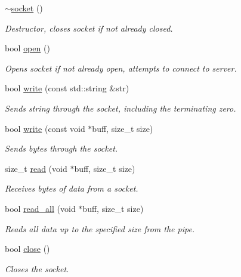 \begin{DoxyCompactItemize}
\hyperlink{classcpen333_1_1process_1_1posix_1_1socket_ad5dc9ffd6311247114538ec84f2c08a0}{$\sim$socket} ()
\begin{DoxyCompactList}\small\item\em Destructor, closes socket if not already closed. \end{DoxyCompactList}\item 
bool \hyperlink{classcpen333_1_1process_1_1posix_1_1socket_a0ac2e0452989cca9e6279602a8d73854}{open} ()
\begin{DoxyCompactList}\small\item\em Opens socket if not already open, attempts to connect to server. \end{DoxyCompactList}\item 
bool \hyperlink{classcpen333_1_1process_1_1posix_1_1socket_a80d3d77a066ebc082196bb2182021818}{write} (const std\+::string \&str)
\begin{DoxyCompactList}\small\item\em Sends string through the socket, including the terminating zero. \end{DoxyCompactList}\item 
bool \hyperlink{classcpen333_1_1process_1_1posix_1_1socket_a60ba24c07c24cfb34ef77b0f137cfc32}{write} (const void $\ast$buff, size\+\_\+t size)
\begin{DoxyCompactList}\small\item\em Sends bytes through the socket. \end{DoxyCompactList}\item 
size\+\_\+t \hyperlink{classcpen333_1_1process_1_1posix_1_1socket_ae6d3e49cdc4e6f548d9d2850d5697a8e}{read} (void $\ast$buff, size\+\_\+t size)
\begin{DoxyCompactList}\small\item\em Receives bytes of data from a socket. \end{DoxyCompactList}\item 
bool \hyperlink{classcpen333_1_1process_1_1posix_1_1socket_a07e6ea97ebce81ea208f58309cc7f944}{read\+\_\+all} (void $\ast$buff, size\+\_\+t size)
\begin{DoxyCompactList}\small\item\em Reads all data up to the specified size from the pipe. \end{DoxyCompactList}\item 
bool \hyperlink{classcpen333_1_1process_1_1posix_1_1socket_a37ac1c8f8ba6dec89066dc1721d0bb0c}{close} ()
\begin{DoxyCompactList}\small\item\em Closes the socket. \end{DoxyCompactList}\end{DoxyCompactItemize}
